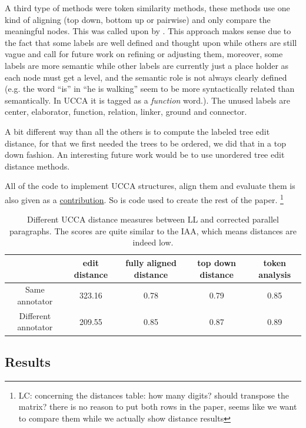 \documentclass[letter,11pt]{article}
\newcommand{\lc}[1]{\footnote{\color{green}LC: #1}}
\begin{document}
A third type of methods were token similarity methods, these methods
use one kind of aligning (top down, bottom up or pairwise) and only
compare the meaningful nodes. This was called upon by \cite{sulem2015conceptual}. 
This approach makes sense due to the fact that some labels
are well defined and thought upon while others are still vague and
call for future work on refining or adjusting them, moreover, some
labels are more semantic while other labels are currently just a place
holder as each node must get a level, and the semantic role is not
always clearly defined (e.g. the word ``is'' in ``he is walking''
seem to be more syntactically related than semantically. In UCCA it is tagged as a \textit{function} word.). The unused
labels are center, elaborator, function, relation, linker, ground
and connector.

A bit different way than all the others is to compute the labeled
tree edit distance\cite{zhang1989simple}, for that we first needed
the trees to be ordered, we did that in a top down fashion. An interesting
future work would be to use unordered tree edit distance methods\cite{zhang1992editing}.

All of the code to implement UCCA structures, align them and evaluate
them is also given as a \href{link will be disclosed upon publication}{contribution}.
So is code used to create the rest of the paper.
\lc{concerning the distances table: how many digits? should transpose the matrix? there is no reason to put both rows in the paper, seems like we want to compare them while we actually show distance results}

\begin{table}[h!]
	\centering
	\begin{tabular}{c|c|c|c|c}
		& edit distance & fully aligned distance & top down distance & token analysis
		\\
		\hline
		Same annotator & 323.16 & 0.78 & 0.79 & 0.85
		\\
		Different annotator & 209.55 & 0.85 & 0.87 & 0.89
		\\
		\end{tabular}
		\caption{Different UCCA distance measures between LL and corrected parallel paragraphs. The scores are quite similar to the IAA, which means distances are indeed low.\label{tab:Distances}}
	\end{table}
		
	\subsection{Results}
	
\end{document}

